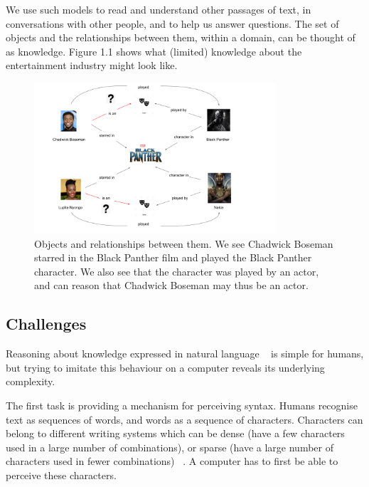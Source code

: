 \noindent We use such models to read and understand other passages of text, in conversations with other people, and to help us answer questions. The set of objects and the relationships between them, within a domain, can be thought of as knowledge. Figure 1.1 shows what (limited) knowledge about the entertainment industry might look like. 

\begin{figure} [H]
   	\centering
    	\includegraphics[width=0.8\textwidth, height=0.4\textheight]{Entities_and_the_Relationships_Between_Them}
	\captionsetup{justification=centering}
	\caption{Objects and relationships between them. We see Chadwick Boseman starred in the Black Panther film and played the Black Panther character. We also see that the character was played by an actor, and can reason that Chadwick Boseman may thus be an actor.}
\end{figure}

\subsection{Challenges} 

Reasoning about knowledge expressed in natural language \unskip~\citep{minervini2019differentiable} is simple for humans, but trying to imitate this behaviour on a computer reveals its underlying complexity. \par

\noindent The first task is providing a mechanism for perceiving syntax. Humans recognise text as sequences of words, and words as a sequence of characters. Characters can belong to different writing systems which can be dense (have a few characters used in a large number of combinations), or sparse (have a large number of characters used in fewer combinations) \unskip~\citep{Hua2010}. A computer has to first be able to perceive these characters. \par

